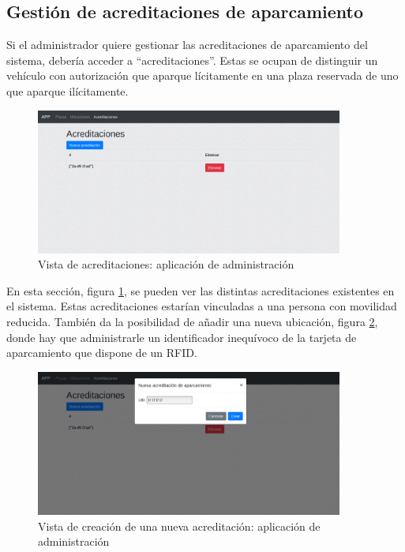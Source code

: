 \newpage
\subsection{Gestión de acreditaciones de aparcamiento}
Si el administrador quiere gestionar las acreditaciones de aparcamiento del sistema, debería acceder a ``acreditaciones''. Estas se ocupan de distinguir un vehículo con autorización que aparque lícitamente en una plaza reservada de uno que aparque ilícitamente.
\begin{figure}[H]
	\centering
	\includegraphics[width=0.9\textwidth]{imagenes/administracion/acreditaciones.png}
	\caption{Vista de acreditaciones: aplicación de administración}
	\label{administracion_acreditaciones}
\end{figure}
En esta sección, figura \ref{administracion_acreditaciones}, se pueden ver las distintas acreditaciones existentes en el sistema. Estas acreditaciones estarían vinculadas a una persona con movilidad reducida. También da la posibilidad de añadir una nueva ubicación, figura \ref{administracion_acreditaciones_nueva}, donde hay que administrarle un identificador inequívoco de la tarjeta de aparcamiento que dispone de un RFID.
\begin{figure}[H]
	\centering
	\includegraphics[width=0.9\textwidth]{imagenes/administracion/acreditaciones_nueva.png}
	\caption{Vista de creación de una nueva acreditación: aplicación de administración}
	\label{administracion_acreditaciones_nueva}
\end{figure}
